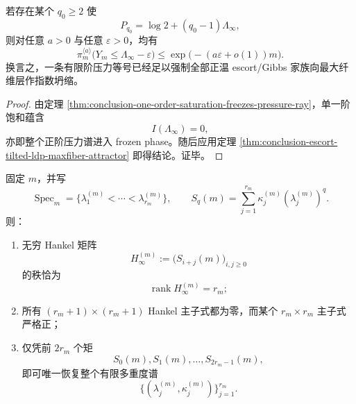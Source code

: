 \begin{corollary}\label{cor:conclusion-one-order-saturation-forces-all-escort-collapse}
若存在某个 \(q_0\ge 2\) 使
\[
P_{q_0}=\log 2+(q_0-1)\Lambda_\infty,
\]
则对任意 \(a>0\) 与任意 \(\varepsilon>0\)，均有
\[
\pi_m^{\langle a\rangle}\!\bigl(Y_m\le \Lambda_\infty-\varepsilon\bigr)
\le
\exp\!\bigl(-(a\varepsilon+o(1))m\bigr).
\]
换言之，一条有限阶压力等号已经足以强制全部正温 escort/Gibbs 家族向最大纤维层作指数坍缩。
\end{corollary}

\begin{proof}
由定理 \ref{thm:conclusion-one-order-saturation-freezes-pressure-ray}，单一阶饱和蕴含
\[
I(\Lambda_\infty)=0,
\]
亦即整个正阶压力谱进入 frozen phase。随后应用定理 \ref{thm:conclusion-escort-tilted-ldp-maxfiber-attractor} 即得结论。证毕。
\end{proof}

\begin{theorem}\label{thm:conclusion-fixed-resolution-hankel-finite-determinacy-multiplicity-spectrum}
固定 \(m\)，并写
\[
\operatorname{Spec}_m=\{\lambda_1^{(m)}<\cdots<\lambda_{r_m}^{(m)}\},
\qquad
S_q(m)=\sum_{j=1}^{r_m}\kappa_j^{(m)}(\lambda_j^{(m)})^q.
\]
则：
\begin{enumerate}
  \item 无穷 Hankel 矩阵
  \[
  H_\infty^{(m)}:=\bigl(S_{i+j}(m)\bigr)_{i,j\ge 0}
  \]
  的秩恰为
  \[
  \operatorname{rank}H_\infty^{(m)}=r_m;
  \]
  \item 所有 \((r_m+1)\times (r_m+1)\) Hankel 主子式都为零，而某个 \(r_m\times r_m\) 主子式严格正；
  \item 仅凭前 \(2r_m\) 个矩
  \[
  S_0(m),S_1(m),\dots,S_{2r_m-1}(m),
  \]
  即可唯一恢复整个有限多重度谱
  \[
  \{(\lambda_j^{(m)},\kappa_j^{(m)})\}_{j=1}^{r_m}.
  \]
\end{enumerate}
\end{theorem}

